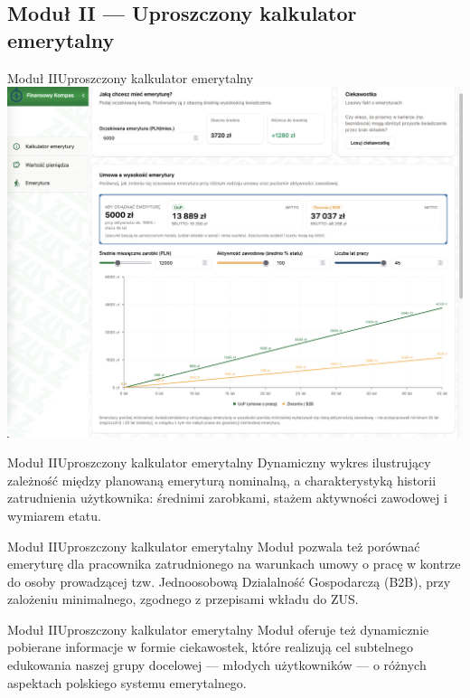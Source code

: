 \subsection{Moduł II --- Uproszczony kalkulator emerytalny}

\begin{frame}[t]{Moduł II}{Uproszczony kalkulator emerytalny}
\includegraphics[width=.8\textwidth]{img/module_2_simple_pension_calculator}
\end{frame}

\begin{frame}[t]{Moduł II}{Uproszczony kalkulator emerytalny}
    Dynamiczny wykres ilustrujący zależność między planowaną emeryturą nominalną,
    a charakterystyką historii zatrudnienia użytkownika: średnimi zarobkami,
    stażem aktywności zawodowej i wymiarem etatu.
\end{frame}


\begin{frame}[t]{Moduł II}{Uproszczony kalkulator emerytalny}
Moduł pozwala też porównać emeryturę dla pracownika zatrudnionego na warunkach umowy o pracę w kontrze do osoby
prowadzącej tzw. Jednoosobową Dzialalność Gospodarczą (B2B), przy zalożeniu minimalnego, zgodnego z przepisami
wkładu do ZUS.
\end{frame}

\begin{frame}[t]{Moduł II}{Uproszczony kalkulator emerytalny}
Moduł oferuje też dynamicznie pobierane informacje w formie ciekawostek, które realizują cel
subtelnego edukowania naszej grupy docelowej --- młodych użytkowników --- o różnych aspektach
polskiego systemu emerytalnego.
\end{frame}

